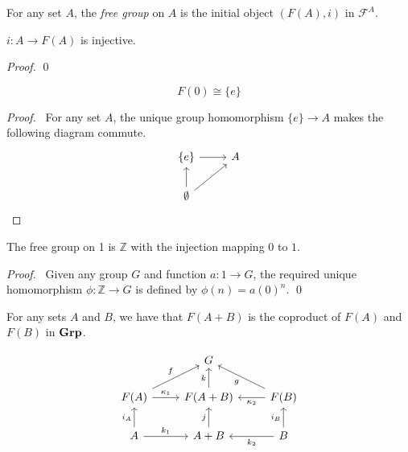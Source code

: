 \begin{df}
    For any set $A$, the \emph{free group} on $A$ is the initial object $(F(A),i)$ in $\mathcal{F}^A$.
\end{df}

\begin{prop}
    $i : A \rightarrow F(A)$ is injective.
\end{prop}

\begin{proof}
    \pf
    \qed
\end{proof}

\begin{prop}
    \[ F(0) \cong \{e\} \]
\end{prop}

\begin{proof}
    \pf\ For any set $A$, the unique group homomorphism $\{e\} \rightarrow A$ makes the following diagram commute.
    \[ \begin{tikzcd}
            \{e\} \arrow[r] & A \\
            \emptyset \arrow[u] \arrow[ur]
        \end{tikzcd} \]
\end{proof}

\begin{prop}
    The free group on 1 is $\mathbb{Z}$ with the injection mapping 0 to $1$.
\end{prop}

\begin{proof}
    \pf\ Given any group $G$ and function $a : 1 \rightarrow G$, the required unique homomorphism $\phi : \mathbb{Z} \rightarrow G$ is defined by $\phi(n) = a(0)^n$. \qed
\end{proof}

\begin{prop}
    For any sets $A$ and $B$, we have that $F(A+B)$ is the coproduct of $F(A)$ and $F(B)$ in $\mathbf{Grp}$.
\end{prop}

\[ \begin{tikzcd}
        & G & \\
        F(A) \arrow[r,"\kappa_1"] \arrow[ur,"f"] & F(A+B) \arrow[u,"k"] & \arrow[l,"\kappa_2"] F(B) \arrow[ul,"g"] \\
        A \arrow[r,"k_1"] \arrow[u,"i_A"] & A+B \arrow[u,"j"] & \arrow[l,"k_2"] \arrow[u,"i_B"] B
    \end{tikzcd} \]

